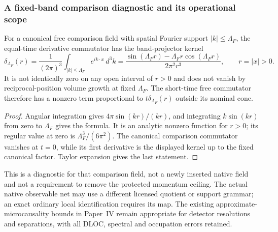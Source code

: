 \documentclass[12pt,a4paper]{article}
\begin{document}
\subsubsection{A fixed-band comparison diagnostic and its operational scope}
\begin{proposition}
\label{p12:prop:v2210-lit-fixed-band-kernel}
For a canonical free comparison field with spatial Fourier support
$|k|\le\Lambda_F$, the equal-time derivative commutator has the
band-projector kernel
\[
 \delta_{\Lambda_F}(r)=\frac1{(2\pi)^3}
    \int_{|k|\le\Lambda_F}e^{ik\cdot x}\,d^3k
 =\frac{\sin(\Lambda_Fr)-\Lambda_Fr\cos(\Lambda_Fr)}{2\pi^2r^3},
 \qquad r=|x|>0.
\]
It is not identically zero on any open interval of $r>0$ and does not
vanish by reciprocal-position volume growth at fixed $\Lambda_F$.
The short-time free commutator therefore has a nonzero term proportional
to $t\delta_{\Lambda_F}(r)$ outside its nominal cone.
\end{proposition}
\begin{proof}
Angular integration gives $4\pi\sin(kr)/(kr)$, and integrating
$k\sin(kr)$ from zero to $\Lambda_F$ gives the formula. It is an
analytic nonzero function for $r>0$; its regular value at zero is
$\Lambda_F^3/(6\pi^2)$. The canonical comparison commutator vanishes
at $t=0$, while its first derivative is the displayed kernel up to the
fixed canonical factor. Taylor expansion gives the last statement.
\end{proof}
This is a diagnostic for that comparison field, not a newly inserted
native field and not a requirement to remove the protected momentum ceiling.
The actual native observable net may use a different licensed quotient or
support grammar; an exact ordinary local identification requires its map.
The existing approximate-microcausality bounds in Paper~IV remain
appropriate for detector resolutions and separations, with all DLOC,
spectral and occupation errors retained.
\end{document}
